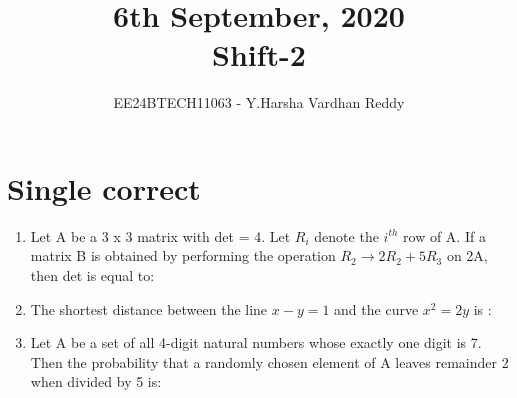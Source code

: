 \documentclass[journal,,12pt,onecolumn]{IEEEtran}
\theoremstyle{remark}
\begin{document}

\vspace{3cm}

\title{6th September, 2020\\Shift-2}
\author{EE24BTECH11063 - Y.Harsha Vardhan Reddy}
\maketitle

\bigskip

\renewcommand{\thefigure}{\theenumi}
\renewcommand{\thetable}{\theenumi}

\section*{Single correct}
\begin{enumerate}
    \item Let A be a 3 x 3 matrix with det = 4. Let $R_i$ denote the $i^{th}$ row of A. If a matrix B is obtained by performing the operation $R_2 \rightarrow 2R_2 + 5R_3$ on 2A, then det is equal to: 
    \begin{enumerate}
        \end{enumerate}
        \item The shortest distance between the line $x-y=1$ and the curve $x^2=2y$ is :
        \begin{enumerate}
        \end{enumerate}
\item Let A be a set of all 4-digit natural numbers whose exactly one digit is 7. Then the probability that a randomly chosen element of A leaves remainder 2 when divided by 5 is:
        \begin{enumerate}
        \begin{multicols}{4}

\end{multicols}
\end{enumerate}
\end{enumerate}
\end{document}
